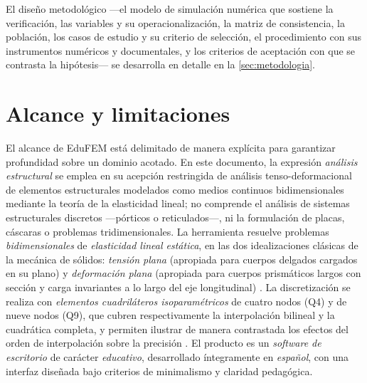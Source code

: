 El diseño metodológico —el modelo de simulación numérica que sostiene la verificación, las variables y su operacionalización, la matriz de consistencia, la población, los casos de estudio y su criterio de selección, el procedimiento con sus instrumentos numéricos y documentales, y los criterios de aceptación con que se contrasta la hipótesis— se desarrolla en detalle en la \autoref{sec:metodologia}.

\section*{Alcance y limitaciones}

El alcance de EduFEM está delimitado de manera explícita para garantizar profundidad sobre un dominio acotado. En este documento, la expresión \emph{análisis estructural} se emplea en su acepción restringida de análisis tenso-deformacional de elementos estructurales modelados como medios continuos bidimensionales mediante la teoría de la elasticidad lineal; no comprende el análisis de sistemas estructurales discretos —pórticos o reticulados—, ni la formulación de placas, cáscaras o problemas tridimensionales. La herramienta resuelve problemas \emph{bidimensionales} de \emph{elasticidad lineal estática}, en las dos idealizaciones clásicas de la mecánica de sólidos: \emph{tensión plana} (apropiada para cuerpos delgados cargados en su plano) y \emph{deformación plana} (apropiada para cuerpos prismáticos largos con sección y carga invariantes a lo largo del eje longitudinal) \autocite[p.~11]{timoshenko1970elasticity}. La discretización se realiza con \emph{elementos cuadriláteros isoparamétricos} de cuatro nodos (Q4) y de nueve nodos (Q9), que cubren respectivamente la interpolación bilineal y la cuadrática completa, y permiten ilustrar de manera contrastada los efectos del orden de interpolación sobre la precisión \autocites[pp.~137-138]{hughes2000fem}[pp.~164, 183-184]{onate2009structural}. El producto es un \emph{software de escritorio} de carácter \emph{educativo}, desarrollado íntegramente en \emph{español}, con una interfaz diseñada bajo criterios de minimalismo y claridad pedagógica.

